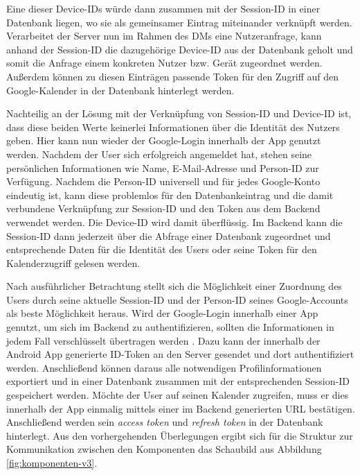 Eine dieser Device-\acp{ID} würde dann zusammen mit der Session-\ac{ID} in einer Datenbank liegen, wo sie als gemeinsamer Eintrag miteinander verknüpft werden. Verarbeitet der Server nun im Rahmen des \aclp{DM} eine Nutzeranfrage, kann anhand der Session-\ac{ID} die dazugehörige Device-\ac{ID} aus der Datenbank geholt und somit die Anfrage einem konkreten Nutzer bzw. Gerät zugeordnet werden. Außerdem können zu diesen Einträgen passende Token für den Zugriff auf den Google-Kalender in der Datenbank hinterlegt werden. 

Nachteilig an der Lösung mit der Verknüpfung von Session-\ac{ID} und Device-\ac{ID} ist, dass diese beiden Werte keinerlei Informationen über die Identität des Nutzers geben. Hier kann nun wieder der Google-Login innerhalb der App genutzt werden. Nachdem der User sich erfolgreich angemeldet hat, stehen seine persönlichen Informationen wie Name, E-Mail-Adresse und Person-\ac{ID} zur Verfügung. Nachdem die Person-\ac{ID} universell und für jedes Google-Konto eindeutig ist, kann diese problemlos für den Datenbankeintrag und die damit verbundene Verknüpfung zur Session-\ac{ID} und den Token aus dem Backend verwendet werden. Die Device-\ac{ID} wird damit überflüssig. Im Backend kann die Session-\ac{ID} dann jederzeit über die Abfrage einer Datenbank zugeordnet und entsprechende Daten für die Identität des Users oder seine Token für den Kalenderzugriff gelesen werden. 

Nach ausführlicher Betrachtung stellt sich die Möglichkeit einer Zuordnung des Users durch seine aktuelle Session-\ac{ID} und der Person-\ac{ID} seines Google-Accounts als beste Möglichkeit heraus. Wird der Google-Login innerhalb einer App genutzt, um sich im Backend zu authentifizieren, sollten die Informationen in jedem Fall verschlüsselt übertragen werden \cite{google_developers_authenticate_2018}. Dazu kann der innerhalb der Android App generierte \ac{ID}-Token an den Server gesendet und dort authentifiziert werden. Anschließend können daraus alle notwendigen Profilinformationen exportiert und in einer Datenbank zusammen mit der entsprechenden Session-\ac{ID} gespeichert werden. Möchte der User auf seinen Kalender zugreifen, muss er dies innerhalb der App einmalig mittels einer im Backend generierten \ac{URL} bestätigen. Anschließend werden sein \textit{access token} und \textit{refresh token} in der Datenbank hinterlegt. Aus den vorhergehenden Überlegungen ergibt sich für die Struktur zur Kommunikation zwischen den Komponenten das Schaubild aus Abbildung \ref{fig:komponenten-v3}.
\newline

